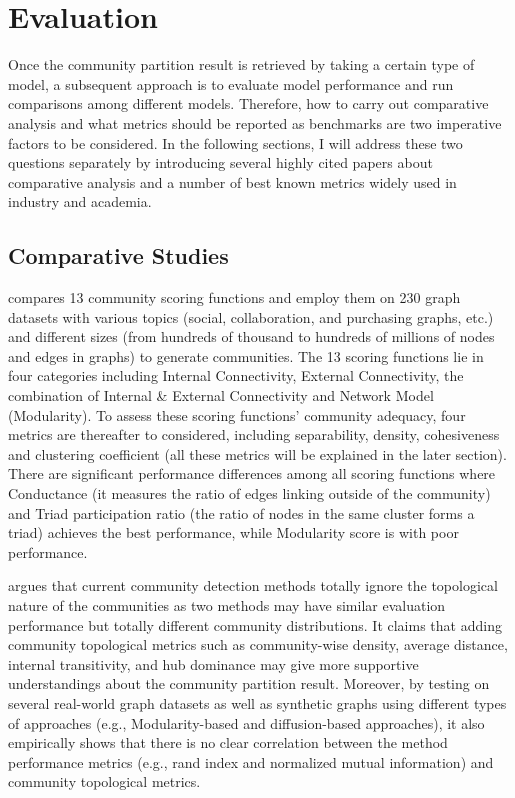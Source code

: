 
\section{Evaluation}
Once the community partition result is retrieved by taking a certain type of model, a subsequent approach is to evaluate model performance and run comparisons among different models. Therefore, how to carry out comparative analysis and what metrics should be reported as benchmarks are two imperative factors to be considered. In the following sections, I will address these two questions separately by introducing several highly cited papers about comparative analysis and a number of best known metrics widely used in industry and academia.    

\subsection{Comparative Studies}
\cite{yang2015defining} compares 13 community scoring functions and employ them on 230 graph datasets with various topics (social, collaboration, and purchasing graphs, etc.) and different sizes (from hundreds of thousand to hundreds of millions of nodes and edges in graphs) to generate communities. The 13 scoring functions lie in four categories including Internal Connectivity, External Connectivity, the combination of Internal \& External Connectivity and Network Model (Modularity). To assess these scoring functions' community adequacy, four metrics are thereafter to considered, including separability, density, cohesiveness and clustering coefficient (all these metrics will be explained in the later section). There are significant performance differences among all scoring functions  where Conductance (it measures the ratio of edges linking outside of the community) and Triad participation ratio (the ratio of nodes in the same cluster forms a triad) achieves the best performance, while Modularity score is with poor performance.

\cite{orman2012comparative} argues that current community detection methods totally ignore the topological nature
of the communities as two methods may have similar evaluation performance but totally different community distributions. It claims that adding community topological metrics such as community-wise density, average distance, internal transitivity, and hub dominance may give more supportive understandings about the community partition result. Moreover, by testing on several real-world graph datasets as well as synthetic graphs using different types of approaches (e.g., Modularity-based and diffusion-based approaches), it also empirically shows that there is no clear correlation between the method performance metrics (e.g., rand index and normalized mutual information) and community topological metrics. 

